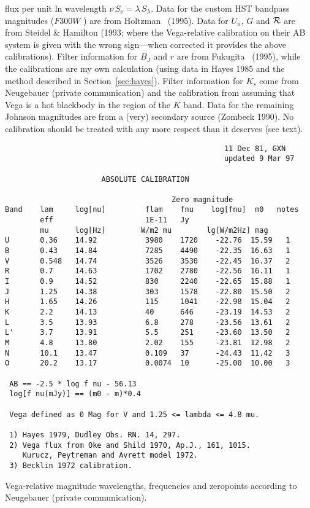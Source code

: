 \begin{table}[p]
{flux per unit ln wavelength $\nu\,S_{\nu}=\lambda\,S_{\lambda}$.  Data
for the custom HST bandpass magnitudes ($F300W$ \etc) are from
Holtzman \etal\ (1995).  Data for $U_n$, $G$ and $\cal R$ are from
Steidel \& Hamilton (1993; where the Vega-relative calibration on
their AB system is given with the wrong sign---when corrected it
provides the above calibrations).  Filter information for $B_J$ and
$r$ are from Fukugita \etal\ (1995), while the calibrations are my own
calculation (using data in Hayes 1985 and the method described in
Section~\ref{sec:hayes}).  Filter information for $K_s$ come from
Neugebauer (private communication) and the calibration from assuming
that Vega is a hot blackbody in the region of the $K$ band.  Data for
the remaining Johnson magnitudes are from a (very) secondary source
(Zombeck 1990).  No calibration should be treated with any more
respect than it deserves (see text).}
\label{tab:magtable}
\end{table}

\begin{table}[p]
\begin{verbatim}
                                                  11 Dec 81, GXN
                                                  updated 9 Mar 97

                      ABSOLUTE CALIBRATION

                                      Zero magnitude
Band    lam     log[nu]         flam    fnu    log[fnu]  m0   notes
        eff                     1E-11   Jy
        mu      log[Hz]        W/m2 mu        lg[W/m2Hz] mag
U       0.36    14.92           3980    1720    -22.76  15.59   1
B       0.43    14.84           7285    4490    -22.35  16.63   1
V       0.548   14.74           3526    3530    -22.45  16.37   2
R       0.7     14.63           1702    2780    -22.56  16.11   1
I       0.9     14.52           830     2240    -22.65  15.88   1
J       1.25    14.38           303     1578    -22.80  15.50   2
H       1.65    14.26           115     1041    -22.98  15.04   2
K       2.2     14.13           40      646     -23.19  14.53   2
L       3.5     13.93           6.8     278     -23.56  13.61   2
L'      3.7     13.91           5.5     251     -23.60  13.50   2
M       4.8     13.80           2.02    155     -23.81  12.98   2
N       10.1    13.47           0.109   37      -24.43  11.42   3
O       20.2    13.17           0.0074  10      -25.00  10.00   3

 AB == -2.5 * log f nu - 56.13
 log[f nu(mJy)] == (m0 - m)*0.4

 Vega defined as 0 Mag for V and 1.25 <= lambda <= 4.8 mu.

 1) Hayes 1979, Dudley Obs. RN. 14, 297.
 2) Vega flux from Oke and Shild 1970, Ap.J., 161, 1015.
    Kurucz, Peytreman and Avrett model 1972.
 3) Becklin 1972 calibration.
\end{verbatim}
\caption[Neugebauer's Vega-relative magnitude wavelengths, frequencies
and zeropoints.]{
Vega-relative magnitude wavelengths, frequencies and zeropoints
according to Neugebauer (private communication).}
\label{tab:gxnmagtable}
\end{table}

